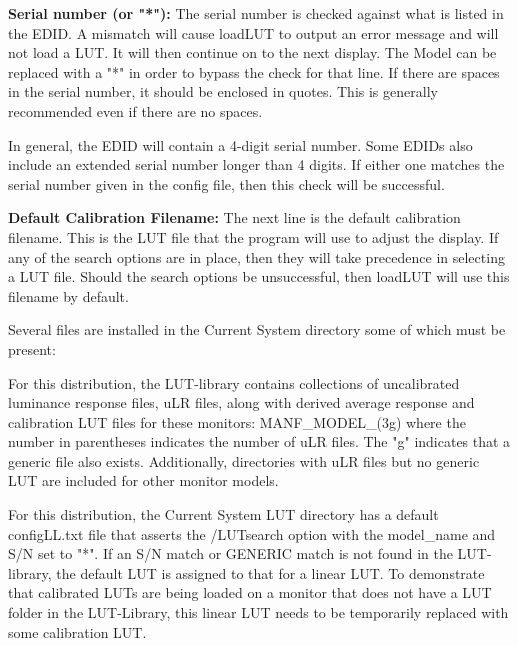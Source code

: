 \textbf{Serial number (or "*"):} The serial number is checked against what is listed in the EDID. A mismatch will cause loadLUT to output an error message and will not load a LUT. It will then continue on to the next display. The Model can be replaced with a "*" in order to bypass the check for that line. If there are spaces in the serial number, it should be enclosed in quotes. This is generally recommended even if there are no spaces. 

In general, the EDID will contain a 4-digit serial number. Some EDIDs also include an extended serial number longer than 4 digits. If either one matches the serial number given in the config file, then this check will be successful. 

\textbf{Default Calibration Filename:} The next line is the default calibration filename. This is the LUT file that the program will use to adjust the display. If any of the search options are in place, then they will take precedence in selecting a LUT file. Should the search options be unsuccessful, then loadLUT will use this filename by default.

Several files are installed in the Current System directory some of which must be present:


For this distribution, the LUT-library contains collections of uncalibrated luminance response files, uLR files, along with derived average response and calibration LUT files for these monitors: MANF\_MODEL\_(3g) where the number in parentheses indicates the number of uLR files. The "g" indicates that a generic file also exists. Additionally, directories with uLR files but no generic LUT are included for other monitor models. 

For this distribution, the Current System LUT directory has a default \textnormal{configLL.txt} file that asserts the /LUTsearch option with the model\_name and S/N set to "*". If an S/N match or GENERIC match is not found in the LUT-library, the default LUT is assigned to that for a linear LUT. To demonstrate that calibrated LUTs are being loaded on a monitor that does not have a LUT folder in the LUT-Library, this linear LUT needs to be temporarily replaced with some calibration LUT. 

